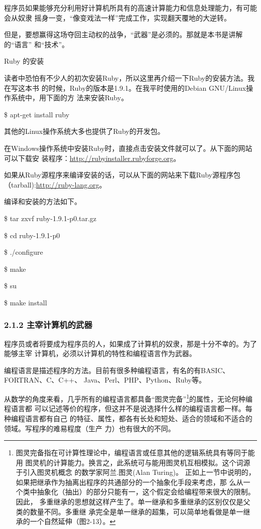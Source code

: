 \documentclass[11pt]{ctexart}
\begin{document}
程序员如果能够充分利用好计算机所具有的高速计算能力和信息处理能力，有可能会从奴隶
摇身一变，“像变戏法一样”完成工作，实现翻天覆地的大逆转。

但是，要想赢得这场夺回主动权的战争，“武器”是必须的。那就是本书是讲解的“语言”
和“技术”。

Ruby 的安装

读者中恐怕有不少人的初次安装Ruby，所以这里再介绍一下Ruby的安装方法。我在写这本书
的时候，Ruby的版本是1.9.1。在我平时使用的Debian GNU/Linux操作系统中，用下面的方
法来安装Ruby。

\$ apt-get install ruby

其他的Linux操作系统大多也提供了Ruby的开发包。

在Windows操作系统中安装Ruby时，直接点击安装文件就可以了。从下面的网站可以下载安
装程序：\url{http://rubyinstaller.rubyforge.org}。

如果从Ruby源程序来编译安装的话，可以从下面的网站来下载Ruby源程序包
（tarball):\url{http://ruby-lang.org}。

编译和安装的方法如下。

\$ tar zxvf ruby-1.9.1-p0.tar.gz

\$ cd ruby-1.9.1-p0

\$ ./configure

\$ make

\$ su

\$ make install

\subsubsection{2.1.2 主宰计算机的武器}
\label{sec:orgaf65ef3}

程序员或者将要成为程序员的人，如果成了计算机的奴隶，那是十分不幸的。为了能够主宰
计算机，必须以计算机的特性和编程语言作为武器。

编程语言是描述程序的方法。目前有很多种编程语言，有名的有BASIC、FORTRAN、C、C++、
Java、Perl、PHP、Python、Ruby等。

从数学的角度来看，几乎所有的编程语言都具备“图灵完备”\footnote{图灵完备指在可计算性理论中，编程语言或任意其他的逻辑系统具有等同于能用
图灵机的计算能力。换言之，此系统可与能用图灵机互相模拟。这个词源于引入图灵机概念
的数学家阿兰.图灵(Alan Turing)。
正如上一节中说明的，如果把继承作为抽离出程序的共通部分的一个抽象化手段来考虑，那
么从一个类中抽象化（抽出）的部分只能有一，这个假定会给编程带来很大的限制。因此，
多重继承的思想就这样产生了。单一继承和多重继承的区别仅仅是父类的数量不同。多重继
承完全是单一继承的超集，可以简单地看做是单一继承的一个自然延伸（图2-13）。}的属性，无论何种编程语言都
可以记述等价的程序，但这并不是说选择什么样的编程语言都一样。每种编程语言都有自己
的特征、属性，都各有长处和短处、适合的领域和不适合的领域。写程序的难易程度（生产
力）也有很大的不同。
\end{document}
